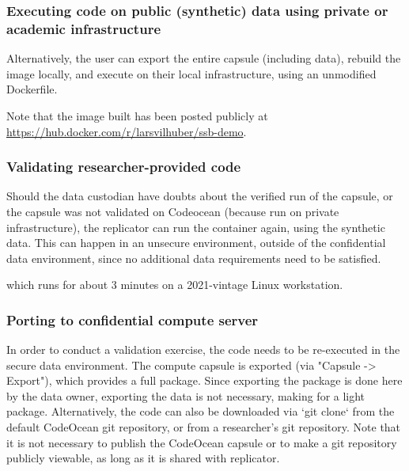 \documentclass[]{hdsr}
\begin{document}
\subsubsection{Executing code on public (synthetic) data using private or academic infrastructure}

Alternatively, the user can export the entire capsule (including data), rebuild the image locally, and execute on their local infrastructure, using an unmodified Dockerfile.


%
Note that the image built has been posted publicly at \url{https://hub.docker.com/r/larsvilhuber/ssb-demo}.


\subsubsection{Validating researcher-provided code}

Should the data custodian have doubts about the verified run of the capsule, or the capsule was not validated on Codeocean (because run on private infrastructure), the replicator can run the container again, using the synthetic data. This can happen in an unsecure environment, outside of the confidential data environment, since no additional data requirements need to be satisfied.





which runs for about 3 minutes on a 2021-vintage Linux workstation. 




\subsubsection{Porting to confidential compute server}

In order to conduct a validation exercise, the code needs to be re-executed in the secure data environment. The compute capsule is exported (via "Capsule -> Export"), which provides a full package. Since exporting the package is done here by the data owner, exporting the data is not necessary, making for a light package. Alternatively, the code can also be downloaded via `git clone` from the default CodeOcean git repository, or from a researcher's git repository. Note that it is not necessary to publish the CodeOcean capsule or to make a git repository publicly viewable, as long as it is shared with replicator.
\end{document}
